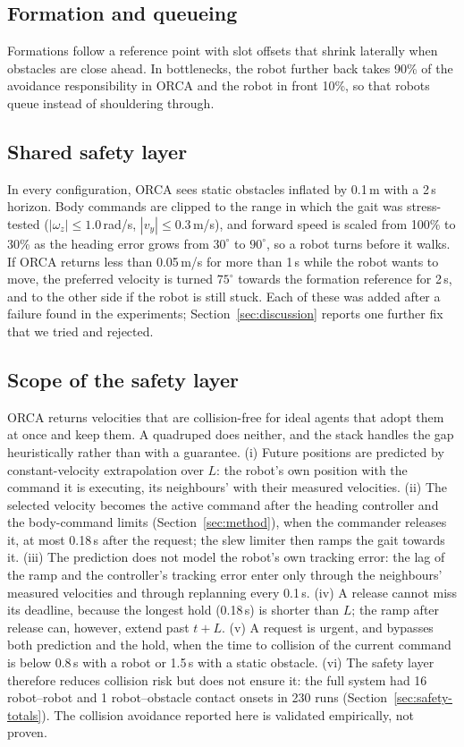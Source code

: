 \documentclass[pdflatex,sn-mathphys-num]{sn-jnl}
\begin{document}
\subsection{Formation and queueing}
Formations follow a reference point with slot offsets that shrink
laterally when obstacles are close ahead. In bottlenecks, the robot further back takes 90\% of the avoidance
responsibility in ORCA and the robot in front 10\%, so that robots queue instead of shouldering through.

\subsection{Shared safety layer}
In every configuration, ORCA sees static obstacles inflated by 0.1\,m with a
2\,s horizon. Body commands are clipped to the range in which the gait was stress-tested
($|\omega_z| \le 1.0$\,rad/s, $|v_y| \le 0.3$\,m/s), and forward speed is scaled from 100\% to 30\% as the
heading error grows from $30^\circ$ to $90^\circ$, so a robot turns before it walks. If ORCA returns less than
0.05\,m/s for more than 1\,s while the robot wants to move, the preferred velocity is turned $75^\circ$
towards the formation reference for 2\,s, and to the other side if the robot is still stuck. Each of these
was added after a failure found in the experiments; Section~\ref{sec:discussion} reports one further fix that
we tried and rejected.

\subsection{Scope of the safety layer}\label{sec:safety-scope}
ORCA returns velocities that are collision-free for ideal agents that adopt them at once and keep them.
A quadruped does neither, and the stack handles the gap heuristically rather than with a guarantee.
(i) Future positions are predicted by constant-velocity extrapolation over $L$: the robot's own position
with the command it is executing, its neighbours' with their measured velocities. (ii) The selected
velocity becomes the active command after the heading controller and the body-command limits (Section~\ref{sec:method}),
when the commander releases it, at most 0.18\,s after the request; the slew limiter then ramps the gait
towards it. (iii) The prediction does not model the robot's own tracking error: the lag of the ramp and
the controller's tracking error enter only through the neighbours' measured velocities and through
replanning every 0.1\,s. (iv) A release cannot miss its deadline, because the longest hold (0.18\,s) is
shorter than $L$; the ramp after release can, however, extend past $t+L$. (v) A request is urgent, and
bypasses both prediction and the hold, when the time to collision of the current command is below 0.8\,s
with a robot or 1.5\,s with a static obstacle. (vi) The safety layer therefore reduces collision risk but
does not ensure it: the full system had 16 robot--robot and 1 robot--obstacle contact onsets in 230 runs
(Section~\ref{sec:safety-totals}).
The collision avoidance reported here is validated empirically, not proven.
\end{document}
